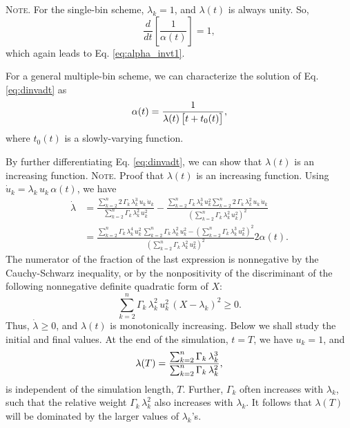 \documentclass[reprint, floatfix]{revtex4-1}
\newcommand{\note}[1]{{\color{DarkGreen}\footnotesize \textsc{Note.} #1}}
\begin{document}
\note{For the single-bin scheme, $\lambda_k = 1$,
and $\lambda(t)$ is always unity.
%
So,
$$
\frac { d   }
      { d t }
\left[
  \frac{      1    }
       { \alpha(t) }
\right]
=
1,
$$
which again leads to Eq. \eqref{eq:alpha_invt1}.


For a general multiple-bin scheme,
we can characterize the solution of
Eq. \eqref{eq:dinvadt} as
\begin{equation}
  \alpha(t)
  =
  \frac{                  1                     }
       { \lambda(t) \, \bigl[ t + t_0(t) \bigr] }
  ,
\notag
\end{equation}
%
where
$t_0(t)$ is a slowly-varying function.
}


By further differentiating Eq. \eqref{eq:dinvadt},
we can show that $\lambda(t)$
is an increasing function.
%
\note{Proof that $\lambda(t)$ is an increasing function.
  Using $\dot u_k = \lambda_k \, u_k \, \alpha(t)$,
  we have
  $$
  \begin{aligned}
    \dot \lambda
    &=
    \frac
    {
      \sum_{k = 2}^n 2 \, \Gamma_k \, \lambda_k^3 \, u_k \, \dot u_k
    }
    {
      \sum_{k = 2}^n \Gamma_k \, \lambda_k^2 \, u_k^2
    }
    -
    \frac
    {
      \sum_{k = 2}^n \Gamma_k \, \lambda_k^3 \, u_k^2
      \sum_{k = 2}^n 2 \, \Gamma_k \, \lambda_k^2 \, u_k \, \dot u_k
    }
    {
      \left(
        \sum_{k = 2}^n \Gamma_k \, \lambda_k^2 \, u_k^2
      \right)^2
    }
    \\
    &=
    \frac
    {
      \sum_{k = 2}^n \Gamma_k \, \lambda_k^4 \, u_k^2
      \,
      \sum_{k = 2}^n \Gamma_k \, \lambda_k^2 \, u_k^2
      -
      \left(
        \sum_{k = 2}^n \Gamma_k \, \lambda_k^3 \, u_k^2
      \right)^2
    }
    {
      \left(
        \sum_{k = 2}^n \Gamma_k \, \lambda_k^2 \, u_k^2
      \right)^2
    }
    2 \alpha(t).
  \end{aligned}
  $$
  The numerator of the fraction of the last expression
  is nonnegative by the Cauchy-Schwarz inequality,
  or by the nonpositivity of the discriminant
  of the following nonnegative definite quadratic form of $X$:
  $$
  \sum_{k = 2}^n \Gamma_k \, \lambda_k^2 \, u_k^2 \, (X - \lambda_k)^2 \ge 0.
  $$
  Thus, $\dot \lambda \ge 0$, and $\lambda(t)$ is monotonically increasing.
}%
%
Below we shall study the initial and final values.
%
At the end of the simulation,
$t = T$, we have $u_k = 1$, and
%
\begin{equation}
  \lambda(T)
  =
  \frac{
    \sum_{ k = 2 }^n
      \Gamma_k \, \lambda_k^3
  }
  {
    \sum_{ k = 2 }^n
      \Gamma_k \, \lambda_k^2
  }
  ,
\notag
\end{equation}
is independent of the simulation length, $T$.
%
Further, $\Gamma_k$ often increases with $\lambda_k$,
such that the relative weight $\Gamma_k \, \lambda_k^2$
also increases with $\lambda_k$.
%
It follows that $\lambda(T)$ will be dominated
by the larger values of $\lambda_k$'s.
\end{document}
